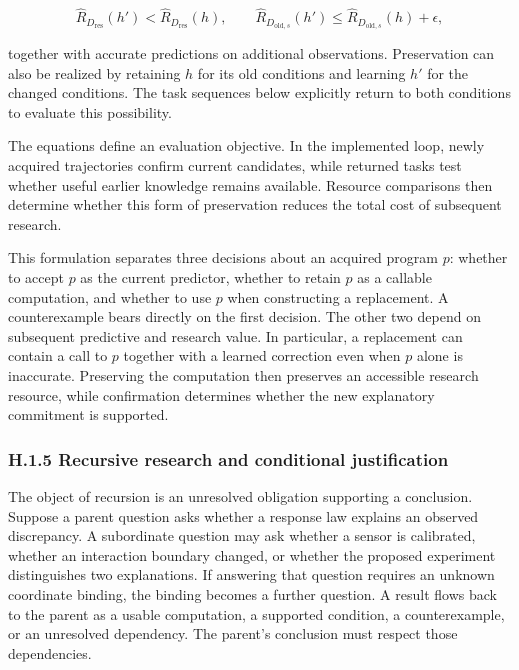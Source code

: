 \documentclass[twoside,11pt]{article}
\begin{document}
\[
\widehat R_{D_{\mathrm{res}}}(h')
<\widehat R_{D_{\mathrm{res}}}(h),
\qquad
\widehat R_{D_{\mathrm{old},s}}(h')
\leq\widehat R_{D_{\mathrm{old},s}}(h)+\epsilon,
\]


together with accurate predictions on additional observations. Preservation can also be realized by retaining \(h\) for its old conditions and learning \(h'\) for the changed conditions. The task sequences below explicitly return to both conditions to evaluate this possibility.


The equations define an evaluation objective. In the implemented loop, newly acquired trajectories confirm current candidates, while returned tasks test whether useful earlier knowledge remains available. Resource comparisons then determine whether this form of preservation reduces the total cost of subsequent research.


This formulation separates three decisions about an acquired program \(p\): whether to accept \(p\) as the current predictor, whether to retain \(p\) as a callable computation, and whether to use \(p\) when constructing a replacement. A counterexample bears directly on the first decision. The other two depend on subsequent predictive and research value. In particular, a replacement can contain a call to \(p\) together with a learned correction even when \(p\) alone is inaccurate. Preserving the computation then preserves an accessible research resource, while confirmation determines whether the new explanatory commitment is supported.


\subsubsection*{H.1.5 Recursive research and conditional justification}

The object of recursion is an unresolved obligation supporting a conclusion. Suppose a parent question asks whether a response law explains an observed discrepancy. A subordinate question may ask whether a sensor is calibrated, whether an interaction boundary changed, or whether the proposed experiment distinguishes two explanations. If answering that question requires an unknown coordinate binding, the binding becomes a further question. A result flows back to the parent as a usable computation, a supported condition, a counterexample, or an unresolved dependency. The parent's conclusion must respect those dependencies.
\end{document}
